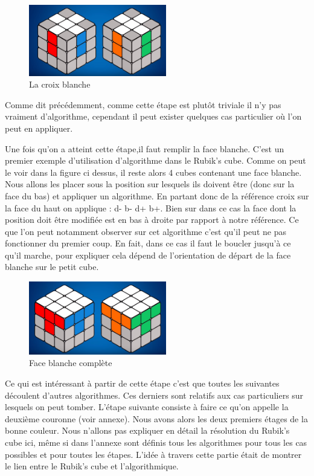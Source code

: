 \begin{figure}[!htb]
  \centering
  \includegraphics[width=60mm,scale=0.5]{images/rubiks-cube2.PNG}
  \caption{La croix blanche}
  \label{fig:boat1}
\end{figure}

Comme dit précédemment, comme cette étape est plutôt triviale il n'y pas vraiment d'algorithme, cependant il peut exister quelques cas particulier où l'on peut en appliquer. \cite{54}

Une fois qu'on a atteint cette étape,il faut remplir la face blanche. C'est un premier exemple d'utilisation d'algorithme dans le Rubik's cube. Comme on peut le voir dans la figure ci dessus, il reste alors 4 cubes contenant une face blanche. Nous allons les placer sous la position sur lesquels ils doivent être (donc sur la face du bas) et appliquer un algorithme. En partant donc de la référence croix sur la face du haut on applique : d- b- d+ b+. Bien sur dans ce cas la face dont la position doit être modifiée est en bas à droite par rapport à notre référence. Ce que l'on peut notamment observer sur cet algorithme c'est qu'il peut ne pas fonctionner du premier coup. En fait, dans ce cas il faut le boucler jusqu'à ce qu'il marche, pour expliquer cela dépend de l'orientation de départ de la face blanche sur le petit cube.

\begin{figure}[!htb]
  \centering
  \includegraphics[width=60mm,scale=0.5]{images/rubiks-cube3.PNG}
  \caption{Face blanche complète}
  \label{fig:boat1}
\end{figure}

Ce qui est intéressant à partir de cette étape c'est que toutes les suivantes découlent d'autres algorithmes. Ces derniers sont relatifs aux cas particuliers sur lesquels on peut tomber. L'étape suivante consiste à faire ce qu'on appelle la deuxième couronne (voir annexe). Nous avons alors les deux premiers étages de la bonne couleur. Nous n'allons pas expliquer en détail la résolution du Rubik's cube ici, même si dans l'annexe sont définis tous les algorithmes pour tous les cas possibles et pour toutes les étapes. L'idée à travers cette partie était de montrer le lien entre le Rubik's cube et l'algorithmique.

